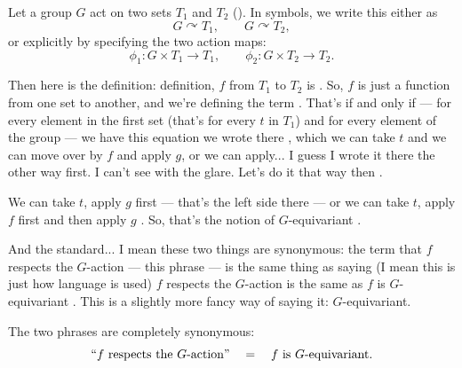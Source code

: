 \begin{content}
Let a group $G$ act on two sets $T_1$ and $T_2$ (). In symbols, we write this either as
\[
G \curvearrowright T_1, \qquad G \curvearrowright T_2,
\]
or explicitly by specifying the two action maps:
\[
\phi_1 \colon G \times T_1 \to T_1, \qquad \phi_2 \colon G \times T_2 \to T_2.
\]
\end{content}

\begin{speech}[00:21:25 - 00:23:08]
Then here is the definition: definition, $f$ from $T_1$ to $T_2$ is  . So, $f$ is just a function from one set to another, and we're defining the term . That's if and only if  --- for every element in the first set (that's for every $t$ in $T_1$) and for every element of the group  --- we have this equation we wrote there , which we can take $t$ and we can move over by $f$ and apply $g$, or we can apply... I guess I wrote it there the other way first. I can't see with the glare. Let's do it that way then .

We can take $t$, apply $g$ first --- that's the left side there --- or we can take $t$, apply $f$ first and then apply $g$ . So, that's the notion of $G$-equivariant .

And the standard... I mean these two things are synonymous: the term that $f$ respects the $G$-action --- this phrase  --- is the same thing as saying (I mean this is just how language is used) $f$ respects the $G$-action is the same as $f$ is $G$-equivariant . This is a slightly more fancy way of saying it: $G$-equivariant.
\end{speech}

\begin{content}

The two phrases are completely synonymous:
\[
\text{\qt{$f$ respects the $G$-action}} \quad = \quad f \text{ is } G\text{-equivariant}.
\]
\end{content}

